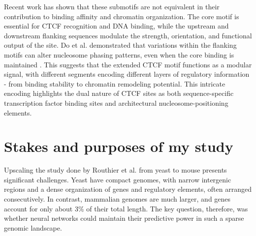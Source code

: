 \documentclass[11pt]{book}
\begin{document}
Recent work has shown that these submotifs are not equivalent in their contribution to binding affinity and chromatin organization. The core motif is essential for CTCF recognition and DNA binding, while the upstream and downstream flanking sequences modulate the strength, orientation, and functional output of the site. Do et al. demonstrated that variations within the flanking motifs can alter nucleosome phasing patterns, even when the core binding is maintained \cite{do_genome_2024}. This suggests that the extended CTCF motif functions as a modular signal, with different segments encoding different layers of regulatory information - from binding stability to chromatin remodeling potential. This intricate encoding highlights the dual nature of CTCF sites as both sequence-specific transcription factor binding sites and architectural nucleosome-positioning elements.

\section{Stakes and purposes of my study}
Upscaling the study done by Routhier et al. from yeast to mouse presents significant challenges. Yeast have compact genomes, with narrow intergenic regions and a dense organization of genes and regulatory elements, often arranged consecutively.  
In contrast, mammalian genomes are much larger, and genes account for only about 3\% of their total length. The key question, therefore, was whether neural networks could maintain their predictive power in such a sparse genomic landscape.
\end{document}
